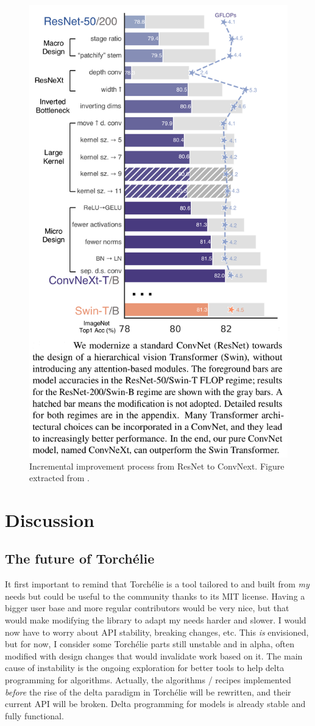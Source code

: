 \begin{figure}[h]
    \centering
    \includegraphics[width=0.7\columnwidth]{90-files/convnext.png}
    \caption{Incremental improvement process from ResNet to ConvNext. Figure extracted from \citet{convnext}.}
    \label{fig:convnext}
\end{figure}

\section{Discussion}

\subsection{The future of Torchélie}

It first important to remind that Torchélie is a tool tailored to and built from \emph{my} needs but could be useful to the community thanks to its MIT license. Having a bigger user base and more regular contributors would be very nice, but that would make modifying the library to adapt my needs harder and slower. I would now have to worry about API stability, breaking changes, etc. This \emph{is} envisioned, but for now, I consider some Torchélie parts still unstable and in alpha, often modified with design changes that would invalidate work based on it. The main cause of instability is the ongoing exploration for better tools to help delta programming for algorithms. Actually, the algorithms / recipes implemented \emph{before} the rise of the delta paradigm in Torchélie will be rewritten, and their current API will be broken. Delta programming for models is already stable and fully functional.

